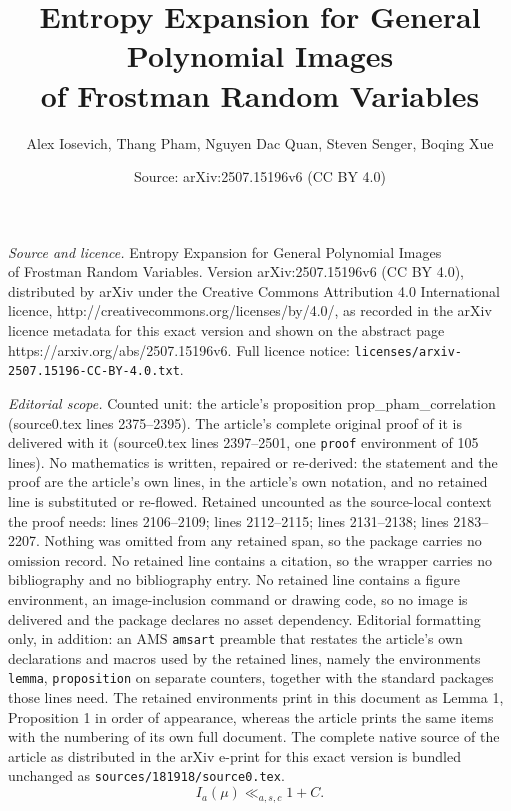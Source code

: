 \documentclass[10pt,a4paper]{amsart}
\title{Entropy Expansion for General Polynomial Images\\ of Frostman Random Variables}
\author{Alex Iosevich, Thang Pham, Nguyen Dac Quan, Steven Senger, Boqing Xue}
\date{Source: arXiv:2507.15196v6 (CC BY 4.0)}
\begin{document}
\maketitle

\noindent\emph{Source and licence.} Entropy Expansion for General Polynomial Images\\ of Frostman Random Variables. Version arXiv:2507.15196v6 (CC BY 4.0), distributed by arXiv under the Creative Commons Attribution 4.0 International licence, http://creativecommons.org/licenses/by/4.0/, as recorded in the arXiv licence metadata for this exact version and shown on the abstract page https://arxiv.org/abs/2507.15196v6. Full licence notice: \texttt{licenses/arxiv-2507.15196-CC-BY-4.0.txt}.\par\smallskip

\noindent\textit{Editorial scope.} Counted unit: the article's proposition prop\_pham\_correlation (source0.tex lines 2375--2395). The article's complete original proof of it is delivered with it (source0.tex lines 2397--2501, one \texttt{proof} environment of 105 lines). No mathematics is written, repaired or re-derived: the statement and the proof are the article's own lines, in the article's own notation, and no retained line is substituted or re-flowed.  Retained uncounted as the source-local context the proof needs: lines 2106--2109; lines 2112--2115; lines 2131--2138; lines 2183--2207.  Nothing was omitted from any retained span, so the package carries no omission record.  No retained line contains a citation, so the wrapper carries no bibliography and no bibliography entry.  No retained line contains a figure environment, an image-inclusion command or drawing code, so no image is delivered and the package declares no asset dependency.  Editorial formatting only, in addition: an AMS \texttt{amsart} preamble that restates the article's own declarations and macros used by the retained lines, namely the environments \texttt{lemma}, \texttt{proposition} on separate counters, together with the standard packages those lines need.  The retained environments print in this document as Lemma 1, Proposition 1 in order of appearance, whereas the article prints the same items with the numbering of its own full document.  The complete native source of the article as distributed in the arXiv e-print for this exact version is bundled unchanged as \texttt{sources/181918/source0.tex}.
\begin{equation}
 I_a(\mu)\ll_{a,s,c}1+C.
 \label{eq_pham_input_energy}
\end{equation}
\end{document}
